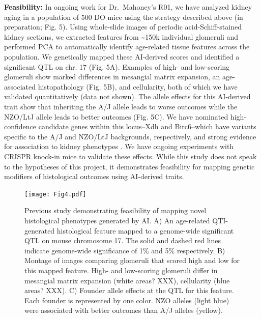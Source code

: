 \documentclass[
  12pt,
]{article}
\begin{document}
\textbf{Feasibility:} In ongoing work for Dr.~Mahoney's R01, we have
analyzed kidney aging in a population of 500 DO mice using the strategy
described above (in preparation; Fig. 5). Using whole-slide images of
periodic acid-Schiff-stained kidney sections, we extracted features from
\textasciitilde150k individual glomeruli and performed PCA to
automatically identify age-related tissue features across the
population. We genetically mapped these AI-derived scores and identified
a significant QTL on chr. 17 (Fig. 5A). Examples of high- and
low-scoring glomeruli show marked differences in mesangial matrix
expansion, an age-associated histopathology (Fig. 5B), and cellularity,
both of which we have validated quantitatively (data not shown). The
allele effects for this AI-derived trait show that inheriting the A/J
allele leads to worse outcomes while the NZO/LtJ allele leads to better
outcomes (Fig. 5C). We have nominated high-confidence candidate genes
within this locus--Xdh and Birc6--which have variants specific to the
A/J and NZO/LtJ backgrounds, respectively, and strong evidence for
association to kidney phenotypes \cite{23249873, 29795190}. We have
ongoing experiments with CRISPR knock-in mice to validate these effects.
While this study does not speak to the hypotheses of this project, it
demonstrates feasibility for mapping genetic modifiers of histological
outcomes using AI-derived traits.

\begin{figure}[ht!]
\texttt{[image: Fig4.pdf]} 
\caption{Previous study demonstrating feasibility of mapping novel histological phenotypes generated by AI. A) An age-related QTI-generated histological feature mapped to a genome-wide significant QTL on mouse chromosome 17. The solid and dashed red lines indicate genome-wide significance of 1\% and 5\% respectively. B) Montage of images comparing glomeruli that scored high and low for this mapped feature. High- and low-scoring glomeruli differ in mesangial matrix expansion (white areas? XXX), cellularity (blue areas? XXX). C) Founder allele effects at the QTL for this feature. Each founder is represented by one color. NZO alleles (light blue) were associated with better outcomes than A/J alleles (yellow).}
\label{fig:histo}
\end{figure}
\end{document}

